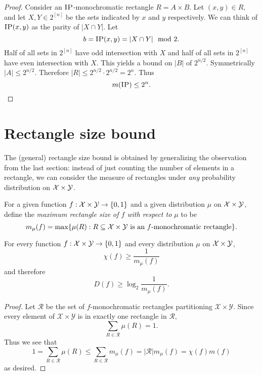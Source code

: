 \begin{proof}
Consider an $\textsc{IP}$-monochromatic rectangle $R = A\times B$. Let $(x,y) \in R$, and let $X, Y \in 2^{[n]}$ be the sets indicated by $x$ and $y$ respectively. We can think of $\textsc{IP}(x,y)$ as the parity of $|X\cap Y|$. Let $$b = \textsc{IP}(x,y) = |X\cap Y| \mod 2.$$ Half of all sets in $2^{[n]}$ have odd intersection with $X$ and half of all sets in $2^{[n]}$ have even intersection with $X$. This yields a bound on $|B|$ of $2^{n/2}$. Symmetrically $|A| \leq 2^{n/2}$. Therefore
$|R| \leq 2^{n/2}\cdot 2^{n/2} = 2^n$. Thus
$$m(\textsc{IP}) \leq 2^n.$$
\end{proof}


\newpage \section{Rectangle size bound}

The (general) rectangle size bound is obtained by generalizing the observation from the last section: instead of just counting the number of elements in a rectangle, we can consider the measure of rectangles under \emph{any} probability distribution on $\mathcal{X} \times \mathcal{Y}$.

\begin{definition}[$m_\mu(f)$]
For a given function $f : \mathcal{X} \times \mathcal{Y} \to \{0,1\}$ and a given distribution $\mu$ on $\mathcal{X} \times \mathcal{Y}$, define the \emph{maximum rectangle size of $f$ with respect to $\mu$} to be
\[
m_\mu(f) = \max \{ \mu(R) : R \subseteq \mathcal{X} \times \mathcal{Y} \mbox{ is an $f$-monochromatic rectangle} \}.
\]
\end{definition}


\begin{lemma}
For every function $f : \mathcal{X} \times \mathcal{Y} \to \{0,1\}$ and every distribution $\mu$ on $\mathcal{X} \times \mathcal{Y}$, 
\[
\chi(f) \ge \frac1{m_\mu(f)}
\]
and therefore
\[
D(f) \ge \log_2 \frac{1}{m_\mu(f)}.
\]
\end{lemma}

\begin{proof}
Let $\mathcal{R}$ be the set of $f$-monochromatic rectangles partitioning $\mathcal{X}\times \mathcal{Y}$. Since every element of $\mathcal{X}\times\mathcal{Y}$ is in exactly one rectangle in $\mathcal{R}$,
$$\sum_{R \in \mathcal{R}} \mu(R) = 1.$$
Thus we see that
$$1 = \sum_{R \in \mathcal{R}} \mu(R) \le \sum_{R \in \mathcal{R}} m_\mu(f) = |\mathcal{R}|m_\mu(f) = \chi(f)m(f)$$
as desired.
\end{proof}


